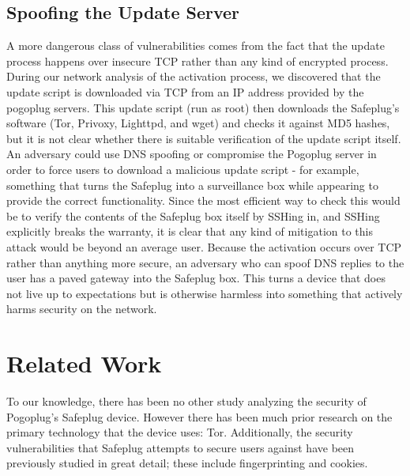 \documentclass[conference]{IEEEtran}
\begin{document}
\subsection{Spoofing the Update Server}
A more dangerous class of vulnerabilities comes from the fact that the update process happens over insecure TCP rather than any kind of encrypted process.  During our network analysis of the activation process, we discovered that the update script is downloaded via TCP from an IP address provided by the pogoplug servers.  This update script (run as root) then downloads the Safeplug's software (Tor, Privoxy, Lighttpd, and wget) and checks it against MD5 hashes, but it is not clear whether there is suitable verification of the update script itself.  An adversary could use DNS spoofing or compromise the Pogoplug server in order to force users to download a malicious update script - for example, something that turns the Safeplug into a surveillance box while appearing to provide the correct functionality.  Since the most efficient way to check this would be to verify the contents of the Safeplug box itself by SSHing in, and SSHing explicitly breaks the warranty, it is clear that any kind of mitigation to this attack would be beyond an average user.  Because the activation occurs over TCP rather than anything more secure, an adversary who can spoof DNS replies to the user has a paved gateway into the Safeplug box.  This turns a device that does not live up to expectations but is otherwise harmless into something that actively harms security on the network.



\section{Related Work}
To our knowledge, there has been no other study analyzing the security of Pogoplug's Safeplug device.  However there has been much prior research on the primary technology that the device uses: Tor.  Additionally, the security vulnerabilities that Safeplug attempts to secure users against have been previously studied in great detail; these include fingerprinting and cookies.  
\end{document}
